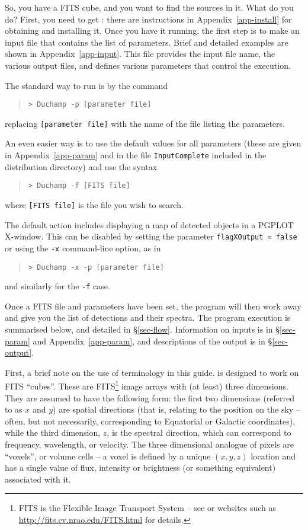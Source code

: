 
So, you have a FITS cube, and you want to find the sources in it. What
do you do? First, you need to get \duchamp: there are instructions in
Appendix~\ref{app-install} for obtaining and installing it. Once you
have it running, the first step is to make an input file that contains
the list of parameters. Brief and detailed examples are shown in
Appendix~\ref{app-input}. This file provides the input file name, the
various output files, and defines various parameters that control the
execution.

The standard way to run \duchamp is by the command
\begin{quote}
{\footnotesize
\texttt{> Duchamp -p [parameter file]}
}
\end{quote}
replacing \texttt{[parameter file]} with the name of the file listing
the parameters. 

An even easier way is to use the default values for all parameters
(these are given in Appendix~\ref{app-param} and in the file
\texttt{InputComplete} included in the distribution directory) and use
the syntax
\begin{quote}
{\footnotesize
\texttt{> Duchamp -f [FITS file]}
}
\end{quote}
where \texttt{[FITS file]} is the file you wish to search. 

The default action includes displaying a map of detected objects in a
PGPLOT X-window. This can be disabled by setting the parameter
\texttt{flagXOutput = false} or using the \texttt{-x} command-line
option, as in
\begin{quote}
{\footnotesize
\texttt{> Duchamp -x -p [parameter file]}
}
\end{quote}
and similarly for the \texttt{-f} case.

Once a FITS file and parameters have been set, the program will then
work away and give you the list of detections and their spectra. The
program execution is summarised below, and detailed in
\S\ref{sec-flow}. Information on inputs is in \S\ref{sec-param} and
Appendix~\ref{app-param}, and descriptions of the output is in
\S\ref{sec-output}.


First, a brief note on the use of terminology in this guide. \duchamp
is designed to work on FITS ``cubes''. These are FITS\footnote{FITS is
the Flexible Image Transport System -- see \citet{hanisch01} or
websites such as
\href{http://fits.cv.nrao.edu/FITS.html}{http://fits.cv.nrao.edu/FITS.html}
for details.} image arrays with (at least) three dimensions. They
are assumed to have the following form: the first two dimensions
(referred to as $x$ and $y$) are spatial directions (that is, relating
to the position on the sky -- often, but not necessarily,
corresponding to Equatorial or Galactic coordinates), while the third
dimension, $z$, is the spectral direction, which can correspond to
frequency, wavelength, or velocity. The three dimensional analogue of
pixels are ``voxels'', or volume cells -- a voxel is defined by a
unique $(x,y,z)$ location and has a single value of flux, intensity
or brightness (or something equivalent) associated with it.

